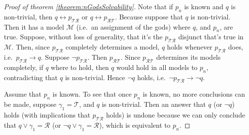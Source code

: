 \documentclass[twoside,twocolumn,a4paper,11pt]{article}
\theoremstyle{definition}
\begin{document}
\begin{proof}[Proof of theorem \ref{theorem:nGodsSolvability}]

Note that
if $p_n$ 
is known
and $q$ is non-trivial, then
$q\leftrightarrow p_{\mathcal{\scriptscriptstyle T}\mathcal{\scriptscriptstyle R}}$ or
$q\leftrightarrow p_{\mathcal{\scriptscriptstyle R}\mathcal{\scriptscriptstyle T}}$.
Because suppose 
that $q$ is non-trivial. Then it has a model $\mathcal{M}$ (i.e.\ an assignment of the gods)
where $q$, and $p_n$, are true. Suppose, without loss of generality, that it's 
the $p_{\mathcal{\scriptscriptstyle T}\mathcal{\scriptscriptstyle R}}$
disjunct that's true in $\mathcal{M}$.
Then, since $p_{\mathcal{\scriptscriptstyle T}\mathcal{\scriptscriptstyle R}}$
completely determines a model, $q$ holds whenever 
$p_{\mathcal{\scriptscriptstyle T}\mathcal{\scriptscriptstyle R}}$ does, i.e.\
$p_{\mathcal{\scriptscriptstyle T}\mathcal{\scriptscriptstyle R}}\rightarrow q$.
Suppose $\neg p_{\mathcal{\scriptscriptstyle T}\mathcal{\scriptscriptstyle R}}$.
Then $p_{\mathcal{\scriptscriptstyle R}\mathcal{\scriptscriptstyle T}}$.
Since $p_{\mathcal{\scriptscriptstyle R}\mathcal{\scriptscriptstyle T}}$
determines its models completely, if $q$ where to hold, then $q$ would
hold in all models to $p_n$, contradicting that $q$ is non-trivial.
Hence $\neg q$ holds, i.e.\ 
$\neg p_{\mathcal{\scriptscriptstyle T}\mathcal{\scriptscriptstyle R}}\rightarrow \neg q$.


Assume that $p_n$ is known.
To see that once $p_n$ is known, no more conclusions can be made, 
suppose $\gamma_1\!=\!\mathcal{T}$, 
and $q$ is non-trivial.
Then an answer that $q$ (or $\neg q$) holds 
(with implications that 
$p_{\mathcal{\scriptscriptstyle T}\mathcal{\scriptscriptstyle R}}$ holds)
is undone because we can only conclude that
$q \vee \gamma_1\!=\!\mathcal{R}$ (or $\neg q \vee \gamma_1\!=\!\mathcal{R}$),
which is equivalent to $p_n$.


\end{proof}
\end{document}
